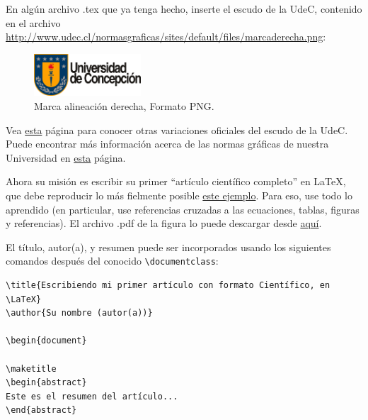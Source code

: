 \documentclass[11pt]{exam}
\begin{document}
\begin{questions}
\item En algún archivo .tex que ya tenga hecho, inserte el escudo de la UdeC, contenido en el archivo \url{http://www.udec.cl/normasgraficas/sites/default/files/marcaderecha.png}:
\begin{figure}[h!]
\begin{center}
\includegraphics[width=4cm]{marcaderecha.png}
\end{center}
\caption{Marca alineación derecha, Formato PNG.}
\label{fig:escudo}
\end{figure}

Vea \href{http://www.udec.cl/normasgraficas/node/7}{esta} página para conocer otras variaciones oficiales del escudo de la UdeC. 
Puede encontrar más información acerca de las normas gráficas de nuestra Universidad en \href{http://www.udec.cl/normasgraficas}{esta} página.

\item Ahora su misión es escribir su primer ``artículo científico completo'' en \LaTeX, que debe reproducir lo más fielmente posible \href{https://github.com/gfrubi/CC/blob/master/guias/07/ejemplo-articulo.pdf}{este ejemplo}. Para eso, use todo lo aprendido (en particular, use referencias cruzadas a las ecuaciones, tablas, figuras y referencias). El archivo .pdf de la figura lo puede descargar desde \href{https://github.com/gfrubi/CC/blob/master/guias/07/fig-ajuste-lineal.pdf}{aquí}.

El título, autor(a), y resumen puede ser incorporados usando los siguientes comandos después del conocido \verb|\documentclass|:

\begin{verbatim}
\title{Escribiendo mi primer artículo con formato Científico, en \LaTeX}
\author{Su nombre (autor(a))}

\begin{document}

\maketitle
\begin{abstract}
Este es el resumen del artículo...
\end{abstract}
\end{verbatim}


\end{questions}
\end{document}
